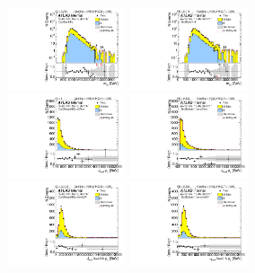 \begin{figure}[htbp!]
\begin{center}
\includegraphics[angle=270, width=0.31\textwidth]{./figures/boosted/Prereweight/Moriond_ThreeTag_Sideband_mHH_l_1.pdf}
\includegraphics[angle=270, width=0.31\textwidth]{./figures/boosted/Sideband/b77_ThreeTag_Sideband_mHH_l_1.pdf}\\
\includegraphics[angle=270, width=0.31\textwidth]{./figures/boosted/Prereweight/Moriond_ThreeTag_Sideband_leadHCand_Pt_m.pdf}
\includegraphics[angle=270, width=0.31\textwidth]{./figures/boosted/Sideband/b77_ThreeTag_Sideband_leadHCand_Pt_m.pdf}\\
\includegraphics[angle=270, width=0.31\textwidth]{./figures/boosted/Prereweight/Moriond_ThreeTag_Sideband_leadHCand_trk0_Pt.pdf}
\includegraphics[angle=270, width=0.31\textwidth]{./figures/boosted/Sideband/b77_ThreeTag_Sideband_leadHCand_trk0_Pt.pdf}\\

\end{center}
\end{figure}
